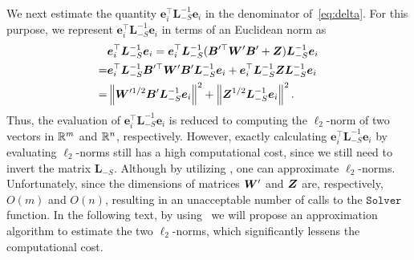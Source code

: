 \documentclass[10pt,twocolumn,twoside]{IEEEtran}
\begin{document}
We next estimate the quantity $\mathbf{e}_i^\top \mathbf{L}_{-S}^{-1}\mathbf{e}_i$ in the denominator  of~\eqref{eq:delta}. For this purpose,
we represent $\mathbf{e}_i^\top \mathbf{L}_{-S}^{-1}\mathbf{e}_i$ in terms of an Euclidean norm as
\begin{equation}\label{eq:denom-solver}
    \begin{split}
        & \boldsymbol{e}_i^\top\boldsymbol{L}_{-S}^{-1}\boldsymbol{e}_i
        =\boldsymbol{e}_i^\top\boldsymbol{L}_{-S}^{-1}(\boldsymbol{B}'^\top\boldsymbol{W}'\boldsymbol{B}'+\boldsymbol{Z})\boldsymbol{L}_{-S}^{-1}\boldsymbol{e}_i\\
        =&\boldsymbol{e}_i^\top\boldsymbol{L}_{-S}^{-1}\boldsymbol{B}'^\top\boldsymbol{W}'\boldsymbol{B}'\boldsymbol{L}_{-S}^{-1}\boldsymbol{e}_i+\boldsymbol{e}_i^\top\boldsymbol{L}_{-S}^{-1}\boldsymbol{Z}\boldsymbol{L}_{-S}^{-1}\boldsymbol{e}_i\\
        =&\left\Vert\boldsymbol{W}'^{1/2}\boldsymbol{B}'\boldsymbol{L}_{-S}^{-1}\boldsymbol{e}_i\right\Vert^2+\left\Vert\boldsymbol{Z}^{1/2}\boldsymbol{L}_{-S}^{-1}\boldsymbol{e}_i\right\Vert^2.
    \end{split}
\end{equation}
Thus, the evaluation of $\mathbf{e}_i^\top \mathbf{L}_{-S}^{-1}\mathbf{e}_i$ is reduced to computing  the $\ell_2$-norm of two vectors in $\mathbb{R}^m$ and $\mathbb{R}^n$, respectively. However, exactly calculating $\mathbf{e}_i^\top \mathbf{L}_{-S}^{-1}\mathbf{e}_i$ by evaluating $\ell_2$-norms still has a high computational cost, since we still need to invert the matrix  $\mathbf{L}_{-S}$. Although by utilizing , one can approximate $\ell_2$-norms. Unfortunately,  since the dimensions of matrices \(\boldsymbol{W}'\) and \(\boldsymbol{Z}\) are, respectively,  $O(m)$ and  $O(n)$, resulting in an unacceptable number of calls to the \(\mathtt{Solver}\) function. In the following text, by using~ we will propose an approximation algorithm to estimate the two $\ell_2$-norms, which significantly lessens the computational cost.
\end{document}
